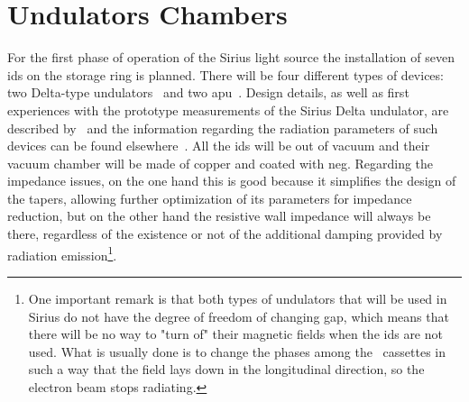 \section{Undulators Chambers}\label{sec:undulators_chambers}

    For the first phase of operation of the Sirius light source the installation of seven \glspl{id} on the storage ring is planned. There will be four different types of devices: two Delta-type undulators~\cite{Temnykh2008} and two \gls{apu}~\cite{Carr1991}. Design details, as well as first experiences with the prototype measurements of the Sirius Delta undulator, are described by~ and the information regarding the radiation parameters of such devices can be found elsewhere~\cite{Sirius2013}. All the \glspl{id} will be out of vacuum and their vacuum chamber will be made of copper and coated with \gls{neg}. Regarding the impedance issues, on the one hand this is good because it simplifies the design of the tapers, allowing further optimization of its parameters for impedance reduction, but on the other hand the resistive wall impedance will always be there, regardless of the existence or not of the additional damping provided by radiation emission\footnote{One important remark is that both types of undulators that will be used in Sirius do not have the degree of freedom of changing gap, which means that there will be no way to "turn of" their magnetic fields when the \glspl{id} are not used. What is usually done is to change the phases among the~ cassettes in such a way that the field lays down in the longitudinal direction, so the electron beam stops radiating.}.

